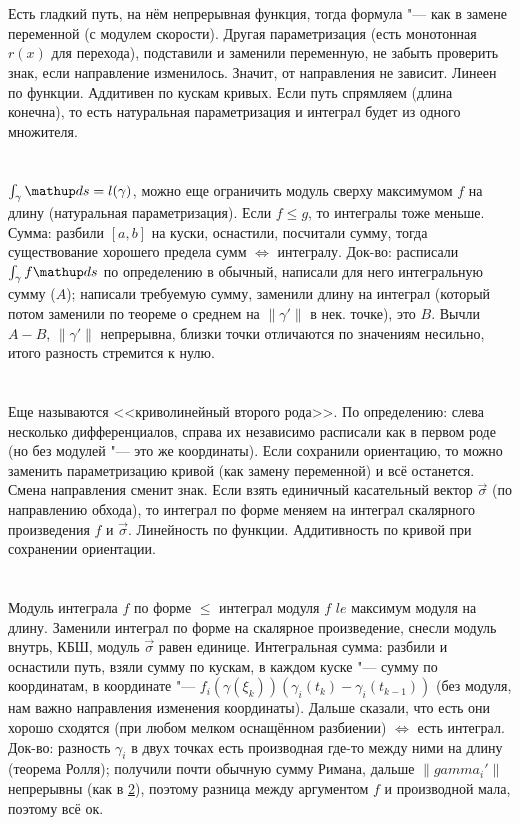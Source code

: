 \section{} %
Есть гладкий путь, на нём непрерывная функция, тогда формула "--- как в замене переменной (с модулем скорости).
Другая параметризация (есть монотонная $r(x)$ для перехода), подставили и заменили переменную, не забыть проверить знак, если направление изменилось.
Значит, от направления не зависит.
Линеен по функции.
Аддитивен по кускам кривых.
Если путь спрямляем (длина конечна), то есть натуральная параметризация и интеграл будет из одного множителя.

\section{}\label{q10} %
$\int_{\gamma} \d s = l(\gamma)$, можно еще ограничить модуль сверху максимумом $f$ на длину (натуральная параметризация).
Если $f \le g$, то интегралы тоже меньше.
Сумма: разбили $[a,b]$ на куски, оснастили, посчитали сумму, тогда существование хорошего предела сумм $\iff$ интегралу.
Док-во: расписали $\int_\gamma f \d s$ по определению в обычный, написали для него интегральную сумму ($A$); написали требуемую
сумму, заменили длину на интеграл (который потом заменили по теореме о среднем на $\|\gamma'\|$ в нек. точке), это $B$.
Вычли $A-B$, $\|\gamma'\|$ непрерывна, близки точки отличаются по значениям несильно, итого разность стремится к нулю.

\section{} %
Еще называются <<криволинейный второго рода>>.
По определению: слева несколько дифференциалов, справа их независимо расписали как в первом роде (но без модулей "--- это же координаты).
Если сохранили ориентацию, то можно заменить параметризацию кривой (как замену переменной) и всё останется.
Смена направления сменит знак.
Если взять единичный касательный вектор $\vec \sigma$ (по направлению обхода), то интеграл по форме меняем на интеграл скалярного произведения $f$ и $\vec\sigma$.
Линейность по функции.
Аддитивность по кривой при сохранении ориентации.

\section{} %
Модуль интеграла $f$ по форме $\le$ интеграл модуля $f$ $le$ максимум модуля на длину.
Заменили интеграл по форме на скалярное произведение, снесли модуль внутрь, КБШ, модуль $\vec \sigma$ равен единице.
Интегральная сумма: разбили и оснастили путь, взяли сумму по кускам, в каждом куске "--- сумму по координатам, в координате "--- $f_i(\gamma(\xi_k))(\gamma_i(t_k)-\gamma_i(t_{k-1}))$
(без модуля, нам важно направления изменения координаты).
Дальше сказали, что есть они хорошо сходятся (при любом мелком оснащённом разбиении) $\iff$ есть интеграл.
Док-во: разность $\gamma_i$ в двух точках есть производная где-то между ними на длину (теорема Ролля); получили почти обычную сумму Римана,
дальше $\|gamma_i'\|$ непрерывны (как в \ref{q10}), поэтому разница между аргументом $f$ и производной мала, поэтому всё ок.

